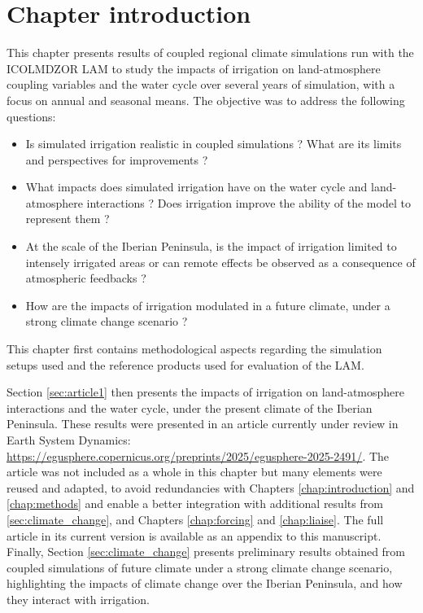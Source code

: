 \section{Chapter introduction}

This chapter presents results of coupled regional climate simulations run with the ICOLMDZOR LAM to study the impacts of irrigation on land-atmosphere coupling variables and the water cycle over several years of simulation, with a focus on annual and seasonal means. 
The objective was to address the following questions:
\begin{itemize}
    \item Is simulated irrigation realistic in coupled simulations ? What are its limits and perspectives for improvements ?
    \item What impacts does simulated irrigation have on the water cycle and land-atmosphere interactions ? Does irrigation improve the ability of the model to represent them ?
    \item At the scale of the Iberian Peninsula, is the impact of irrigation limited to intensely irrigated areas or can remote effects be observed as a consequence of atmospheric feedbacks ?
    \item How are the impacts of irrigation modulated in a future climate, under a strong climate change scenario ?
\end{itemize}

This chapter first contains methodological aspects regarding the simulation setups used and the reference products used for evaluation of the LAM. 

Section \ref{sec:article1} then presents the impacts of irrigation on land-atmosphere interactions and the water cycle, under the present climate of the Iberian Peninsula. These results were presented in an article currently under review in Earth System Dynamics: \url{https://egusphere.copernicus.org/preprints/2025/egusphere-2025-2491/}.
The article was not included as a whole in this chapter but many elements were reused and adapted, to avoid redundancies with Chapters \ref{chap:introduction} and \ref{chap:methods} and enable a better integration with additional results from \ref{sec:climate_change}, and Chapters \ref{chap:forcing} and \ref{chap:liaise}. The full article in its current version is available as an appendix to this manuscript.
Finally, Section \ref{sec:climate_change} presents preliminary results obtained from coupled simulations of future climate under a strong climate change scenario, highlighting the impacts of climate change over the Iberian Peninsula, and how they interact with irrigation.

